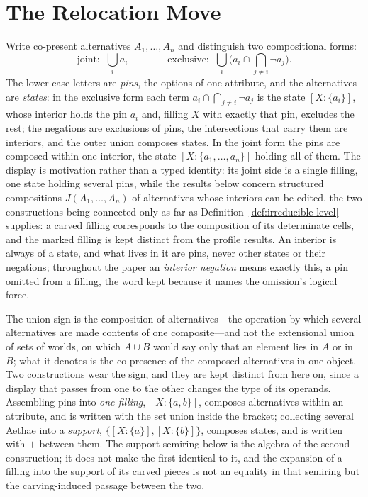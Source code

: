 \documentclass[11pt]{article}
\begin{document}
\section{The Relocation Move}\label{sec:relocation}
Write co-present alternatives $A_1, \dots, A_n$ and distinguish two compositional forms:
\begin{equation}\label{eq:forms}
\text{joint:}\;\; \bigcup_i a_i \qquad\qquad \text{exclusive:}\;\; \bigcup_i \Big( a_i \cap \bigcap_{j \neq i} \neg a_j \Big).
\end{equation}
The lower-case letters are \emph{pins}, the options of one attribute, and the alternatives are \emph{states}: in the exclusive form each term $a_i \cap \bigcap_{j \ne i} \neg a_j$ is the state $[X : \{a_i\}]$, whose interior holds the pin $a_i$ and, filling $X$ with exactly that pin, excludes the rest; the negations are exclusions of pins, the intersections that carry them are interiors, and the outer union composes states. In the joint form the pins are composed within one interior, the state $[X : \{a_1, \ldots, a_n\}]$ holding all of them. The display is motivation rather than a typed identity: its joint side is a single filling, one state holding several pins, while the results below concern structured compositions $J(A_1, \ldots, A_n)$ of alternatives whose interiors can be edited, the two constructions being connected only as far as Definition~\ref{def:irreducible-level} supplies: a carved filling corresponds to the composition of its determinate cells, and the marked filling is kept distinct from the profile results. An interior is always of a state, and what lives in it are pins, never other states or their negations; throughout the paper an \emph{interior negation} means exactly this, a pin omitted from a filling, the word kept because it names the omission's logical force.

The union sign is the composition of alternatives---the operation by which several alternatives are made contents of one composite---and not the extensional union of sets of worlds, on which $A \cup B$ would say only that an element lies in $A$ or in $B$; what it denotes is the co-presence of the composed alternatives in one object. Two constructions wear the sign, and they are kept distinct from here on, since a display that passes from one to the other changes the type of its operands. Assembling pins into \emph{one filling}, $[X : \{a, b\}]$, composes alternatives within an attribute, and is written with the set union inside the bracket; collecting several Aethae into a \emph{support}, $\{[X : \{a\}], [X : \{b\}]\}$, composes states, and is written with $+$ between them. The support semiring below is the algebra of the second construction; it does not make the first identical to it, and the expansion of a filling into the support of its carved pieces is not an equality in that semiring but the carving-induced passage between the two.
\end{document}
